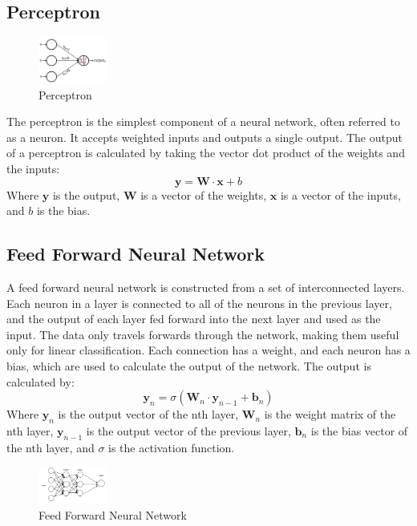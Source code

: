 \documentclass[a1,portrait]{a1poster}
\begin{document}
\begin{multicols}{2}
\subsection*{Perceptron}
\begin{figure}
    \centering
    \includegraphics[width=0.2\textwidth]{assets/perceptron.png}
    \caption{Perceptron}
    \label{fig:perceptron}
\end{figure}
The perceptron is the simplest component of a neural network, often referred to as a neuron. It accepts weighted inputs and outputs a single output. The output of a perceptron is calculated by taking the vector dot product of the weights and the inputs:
\begin{equation}
    \textbf{y} = \textbf{W}\cdot\textbf{x} + b
    \label{eq:perceptron}
\end{equation}
Where $\textbf{y}$ is the output, $\textbf{W}$ is a vector of the weights, $\textbf{x}$ is a vector of the inputs, and $b$ is the bias.

\subsection*{Feed Forward Neural Network}
A feed forward neural network is constructed from a set of interconnected layers. Each neuron in a layer is connected to all of the neurons in the previous layer, and the output of each layer fed forward into the next layer and used as the input. The data only travels forwards through the network, making them useful only for linear classification. Each connection has a weight, and each neuron has a bias, which are used to calculate the output of the network. The output is calculated by: 
\begin{equation}
    \textbf{y}_n=\sigma{(\textbf{W}_n\cdot\textbf{y}_{n-1} + \textbf{b}_n)}
    \label{eq:feed-forward}
\end{equation}
Where $\textbf{y}_n$ is the output vector of the nth layer, $\textbf{W}_n$ is the weight matrix of the nth layer, $\textbf{y}_{n-1}$ is the output vector of the previous layer, $\textbf{b}_n$ is the bias vector of the nth layer, and $\sigma$ is the activation function.
\begin{figure}
    \centering
    \includegraphics[width=0.2\textwidth]{assets/feed forward.png}
    \caption{Feed Forward Neural Network}
    \label{fig:feed-forward}
\end{figure}

\end{multicols}
\end{document}

